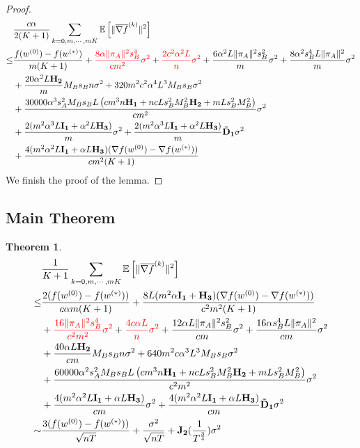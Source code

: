 \documentclass{article}
\newtheorem{theorem}{Theorem}
\newcommand{\EE}[1]{\mathbb{E}\left[#1\right]}
\newcommand{\norm}[1]{\| #1 \|}
\begin{document}
\begin{proof}
  \begin{align*}
    &\frac{c\alpha }{2(K+1)}\sum_{k=0,m,\cdots,mK}\EE{\norm{\overline{\nabla f}^{(k)}}^2}
  \\\leq& \frac{f(w^{(0)})-f(w^{(*)})}{m(K+1)}+\textcolor{red}{\frac{8\alpha \norm{\pi_A}^2s_B^4}{cm^2}\sigma^2}+\textcolor{red}{ \frac{2c^2\alpha^2L}{n}\sigma^2}+\frac{6\alpha^2L\norm{\pi_A}^2s_B^2}{m}\sigma^2+\frac{8\alpha^2s_B^4L\norm{\pi_A}^2}{m}\sigma^2\\&+\frac{20\alpha^2 L \mathbf{H_2}}{m}M_Bs_Bn \sigma^2+320m^2c^2\alpha^4L^3M_Bs_B\sigma^2\\&+\frac{30000\alpha^3 s_A^2M_Bs_BL \left(cm^3n\mathbf{H_1}+nc Ls_B^2M_B^2\mathbf{H_2} +mLs_B^2M_B^2\right)}{cm^2}\sigma^2\\&+\frac{2(m^2\alpha^3L\mathbf{I_1}+\alpha^2 L \mathbf{H_3})}{m}\sigma^2+\frac{2(m^2\alpha^3L\mathbf{I_1}+\alpha^2 L \mathbf{H_3})}{m}\mathbf{\tilde{D}_1}\sigma^2\\&+\frac{4(m^2\alpha^2L\mathbf{I_1}+\alpha L \mathbf{H_3})(\nabla f(w^{(0)})-\nabla f(w^{(*)}))}{cm^2(K+1)}
  \end{align*}
  We finish the proof of the lemma.
\end{proof}

\subsection{Main Theorem}
\begin{theorem}
\begin{align*}
    &\frac{1 }{K+1}\sum_{k=0,m,\cdots,mK}\EE{\norm{\overline{\nabla f}^{(k)}}^2}
  \\\leq& \frac{2(f(w^{(0)})-f(w^{(*)}))}{c\alpha m(K+1)}+\frac{8L(m^2\alpha \mathbf{I_1}+ \mathbf{H_3})(\nabla f(w^{(0)})-\nabla f(w^{(*)}))}{c^2 m^2(K+1)}\nonumber\\&+\textcolor{red}{\frac{16 \norm{\pi_A}^2s_B^4}{c^2 m^2}\sigma^2}+\textcolor{red}{ \frac{4c\alpha L}{n}\sigma^2}+\frac{12\alpha L\norm{\pi_A}^2s_B^2}{c m}\sigma^2+\frac{16\alpha s_B^4L\norm{\pi_A}^2}{c m}\sigma^2\nonumber\\&+\frac{40\alpha L \mathbf{H_2}}{c m}M_Bs_Bn \sigma^2+640m^2c\alpha^3L^3M_Bs_B\sigma^2\nonumber\\&+\frac{60000\alpha^2 s_A^2M_Bs_BL \left(cm^3n\mathbf{H_1}+nc Ls_B^2M_B^2\mathbf{H_2} +mLs_B^2M_B^2\right)}{c^2m^2}\sigma^2\nonumber\\&+\frac{4(m^2\alpha^2L\mathbf{I_1}+\alpha L \mathbf{H_3})}{c m}\sigma^2+\frac{4(m^2\alpha^2L\mathbf{I_1}+\alpha L \mathbf{H_3})}{c m}\mathbf{\tilde{D}_1}\sigma^2
  \\\sim & \frac{3(f(w^{(0)})-f(w^{(*)}))}{\sqrt{nT}}+\frac{\sigma^2}{\sqrt{nT}}+\mathbf{J_2}(\frac{1}{T^{\frac{3}{4}}})\sigma^2
  \end{align*}
\end{theorem}
\end{document}
